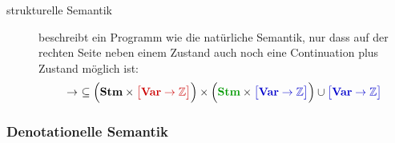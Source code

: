 \documentclass[
  a4paper,
  11pt,
]{scrartcl}
\newcommand{\Z}{\mathbb{Z}}
\begin{document}
\begin{itemize}
\begin{description}
      \item[strukturelle Semantik] beschreibt ein Programm wie die natürliche
        Semantik, nur dass auf der rechten Seite neben einem
        \textcolor{myblue}{Zustand} auch noch eine
        \textcolor{mygreen}{Continuation} plus \textcolor{myblue}{Zustand}
        möglich ist:
        \begin{align*}
          \rightarrow \ \subseteq
          \Big(
          \textbf{Stm}
          \times
          \textcolor{myred}{\big[ \textbf{Var} \rightarrow \Z \big]}
          \Big)
          \times
          \Big(
          \textcolor{mygreen}{\textbf{Stm}}
          \times
          \textcolor{myblue}{\big[ \textbf{Var} \rightarrow \Z \big]}
          \Big)
          \cup
          \textcolor{myblue}{\big[ \textbf{Var} \rightarrow \Z \big]}
        \end{align*}
    \end{description}
\end{itemize}

\subsubsection{Denotationelle Semantik}
\label{ssub:Denotationelle Semantik}
\end{document}
